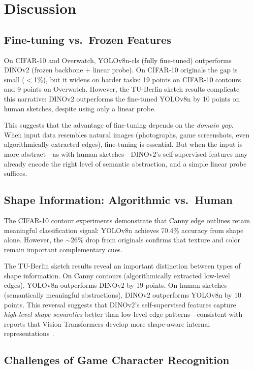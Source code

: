 \documentclass[11pt,a4paper]{article}
\begin{document}
\section{Discussion}

\subsection{Fine-tuning vs.\ Frozen Features}

On CIFAR-10 and Overwatch, YOLOv8n-cls (fully fine-tuned) outperforms DINOv2 (frozen backbone + linear probe). On CIFAR-10 originals the gap is small ($<$1\%), but it widens on harder tasks: 19 points on CIFAR-10 contours and 9 points on Overwatch. However, the TU-Berlin sketch results complicate this narrative: DINOv2 outperforms the fine-tuned YOLOv8n by 10 points on human sketches, despite using only a linear probe.

This suggests that the advantage of fine-tuning depends on the \emph{domain gap}. When input data resembles natural images (photographs, game screenshots, even algorithmically extracted edges), fine-tuning is essential. But when the input is more abstract---as with human sketches---DINOv2's self-supervised features may already encode the right level of semantic abstraction, and a simple linear probe suffices.

\subsection{Shape Information: Algorithmic vs.\ Human}

The CIFAR-10 contour experiments demonstrate that Canny edge outlines retain meaningful classification signal: YOLOv8n achieves 70.4\% accuracy from shape alone. However, the $\sim$26\% drop from originals confirms that texture and color remain important complementary cues.

The TU-Berlin sketch results reveal an important distinction between types of shape information. On Canny contours (algorithmically extracted low-level edges), YOLOv8n outperforms DINOv2 by 19 points. On human sketches (semantically meaningful abstractions), DINOv2 outperforms YOLOv8n by 10 points. This reversal suggests that DINOv2's self-supervised features capture \emph{high-level shape semantics} better than low-level edge patterns---consistent with reports that Vision Transformers develop more shape-aware internal representations~\cite{caron2021emerging}.

\subsection{Challenges of Game Character Recognition}
\end{document}
